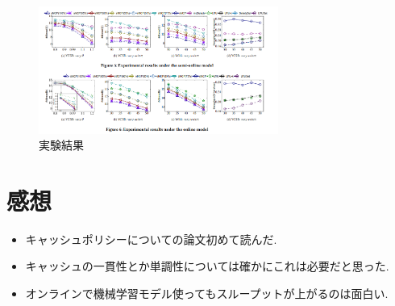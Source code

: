 \documentclass[dvipdfmx,uplatex]{jsarticle}
\theoremstyle{remark}
\newenvironment{kansou}{
    \begin{tcolorbox}[
        colframe=brown,
        colback=brown!10!white,
        colbacktitle=brown!40!white,
        coltitle=black,fonttitle=\bfseries
    ]
}{
    \end{tcolorbox}
}
\begin{document}
\begin{figure}
    \centering
    \includegraphics[width=0.7\textwidth]{img/cache-consistent/semionline-online.png}
    \caption{実験結果}
    \label{fig:semionline-online}
\end{figure}

\section{感想}
\begin{kansou}
\begin{itemize}
  \item キャッシュポリシーについての論文初めて読んだ.
  \item キャッシュの一貫性とか単調性については確かにこれは必要だと思った.
  \item オンラインで機械学習モデル使ってもスループットが上がるのは面白い.
\end{itemize}
\end{kansou}



\end{document}
